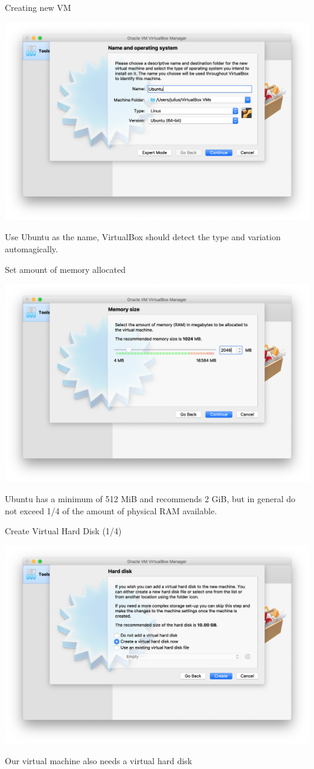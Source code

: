 \documentclass[11pt]{beamer}
\begin{document}
\begin{frame}{Creating new VM}
  \begin{center}
    \includegraphics[width=0.8\linewidth]{vb-new}
  \end{center}
  Use Ubuntu as the name, VirtualBox should detect the type and variation automagically.
\end{frame}

\begin{frame}{Set amount of memory allocated}
  \begin{center}
    \includegraphics[width=0.8\linewidth]{vb-mem}
  \end{center}
  Ubuntu has a minimum of 512 MiB and recommends 2 GiB, but in general do not exceed 1/4 of the amount of physical RAM available.
\end{frame}

\begin{frame}{Create Virtual Hard Disk (1/4)}
  \begin{center}
    \includegraphics[width=0.8\linewidth]{vb-hd}
  \end{center}
  Our virtual machine also needs a virtual hard disk
\end{frame}
\end{document}
